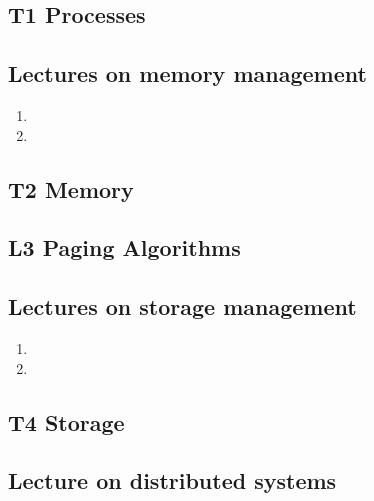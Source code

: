 \documentclass[a4paper,logo]{miunart}
\begin{document}
\subsection{T1 Processes}


\subsection{Lectures on memory management}
\begin{enumerate}
  \item 

  \item 
\end{enumerate}

\subsection{T2 Memory}


\subsection{L3 Paging Algorithms}


\subsection{Lectures on storage management}
\begin{enumerate}
  \item 

  \item 

%
\end{enumerate}

\subsection{T4 Storage}


%

\subsection{Lecture on distributed systems}

\end{document}

